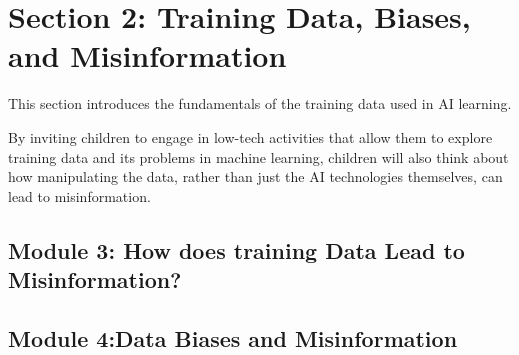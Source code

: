 \documentclass{article}
\begin{document}
\section*{\centering Section 2: Training Data, Biases, and Misinformation}
%

This section introduces the fundamentals of the training data used in AI learning. 

By inviting children to engage in low-tech activities that allow them to explore training data and its problems in machine learning, children will also think about how manipulating the data, rather than just the AI technologies themselves, can lead to misinformation.  

\vspace*{\fill}
\newpage
\subsection*{\centering Module 3: How does training Data Lead to Misinformation?}
%


\newpage
\subsection*{\centering Module 4:Data Biases and Misinformation}
%


\end{document}
